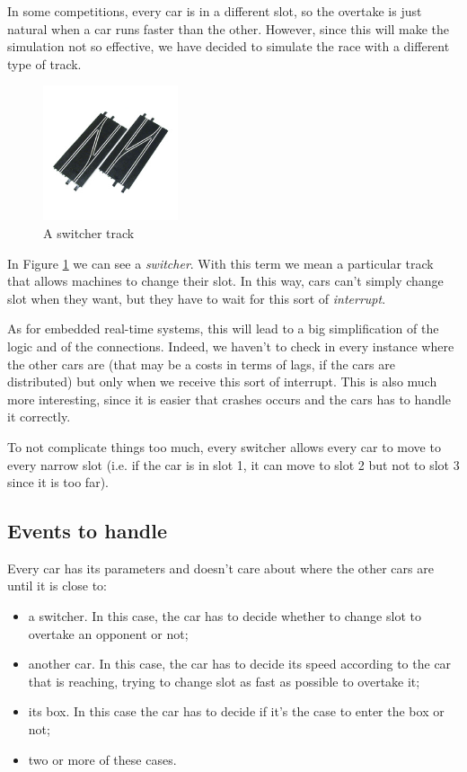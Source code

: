 In some competitions, every car is in a different slot, so the overtake is just natural when a car runs faster than the other. However, since this will make the simulation not so effective, we have decided to simulate the race with a different type of track.

\begin{figure}[H]
\centering %
\includegraphics[width=150px]{./img/switcher.jpg}
\caption{A switcher track}
\label{fig:switcher}
\end{figure}

In Figure \ref{fig:switcher} we can see a \textit{switcher}. With this term we mean a particular track that allows machines to change their slot. In this way, cars can't simply change slot when they want, but they have to wait for this sort of \textit{interrupt}. 

As for embedded real-time systems, this will lead to a big simplification of the logic and of the connections. Indeed, we haven't to check in every instance where the other cars are (that may be a costs in terms of lags, if the cars are distributed) but only when we receive this sort of interrupt. This is also much more interesting, since it is easier that crashes occurs and the cars has to handle it correctly.

To not complicate things too much, every switcher allows every car to move to every narrow slot (i.e. if the car is in slot 1, it can move to slot 2 but not to slot 3 since it is too far).

\subsection{Events to handle}

Every car has its parameters and doesn't care about where the other cars are until it is close to:
\begin{itemize}
\item a switcher. In this case, the car has to decide whether to change slot to overtake an opponent or not;
\item another car. In this case, the car has to decide its speed according to the car that is reaching, trying to change slot as fast as possible to overtake it;
\item its box. In this case the car has to decide if it's the case to enter the box or not;
\item two or more of these cases.
\end{itemize}

